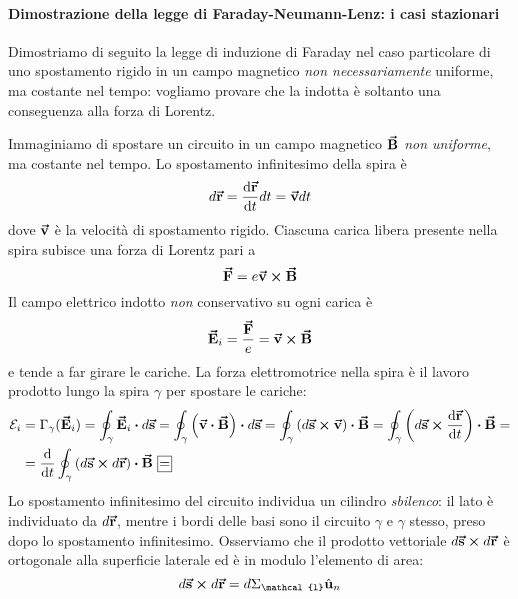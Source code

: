 \paragraph{Dimostrazione della legge di Faraday-Neumann-Lenz: i casi stazionari}
Dimostriamo di seguito la legge di induzione di Faraday nel caso particolare di uno spostamento rigido in un campo magnetico \textit{non necessariamente} uniforme, ma costante nel tempo: vogliamo provare che la \fem indotta è soltanto una conseguenza alla forza di Lorentz.
\begin{demonstration}
	Immaginiamo di spostare un circuito in un campo magnetico $\vb*{\va{B}}$ \textit{non uniforme}, ma costante nel tempo. Lo spostamento infinitesimo della spira è
	\begin{equation*}
		d\vb*{\va{r}}=\dv{\vb*{\va{r}}}{t}dt=\vb*{\va{v}}dt
	\end{equation*}
	dove $\vb*{\va{v}}$ è la velocità di spostamento rigido.	Ciascuna carica libera presente nella spira subisce una forza di Lorentz pari a
	\begin{equation*}
		\vb*{\va{F}}=e\vb*{\va{v}}\cross\vb*{\va{B}}
	\end{equation*}
	Il campo elettrico indotto \textit{non} conservativo su ogni carica è
	\begin{equation*}
		\vb*{\va{E}}_i=\frac{\vb*{\va{F}}}{e}=\vb*{\va{v}}\cross\vb*{\va{B}}
	\end{equation*}
	e tende a far girare le cariche. La forza elettromotrice nella spira è il lavoro prodotto lungo la spira $\gamma$ per spostare le cariche:
	\begin{align*}
		\mathcal{E}_i&=\Gamma_{\gamma}(\vba{E}_i)=\oint_{\gamma} \vba{E}_i\vdot d\vba{s}=\oint_{\gamma} \left(\vba{v}\vdot \vba{B}\right)\vdot d\vba{s}=\oint_{\gamma} \left(d\vba{s}\cross\vba{v}\right)\vdot \vba{B} = \oint_{\gamma} \left(d\vba{s}\cross\dv{\vba{r}}{t}\right)\vdot \vba{B}=\\
		&=\dv{t} \oint_{\gamma}\left(d\vba{s}\cross d\vba{r}\right)\vdot \vba{B}\squarequal
	\end{align*}
	Lo spostamento infinitesimo del circuito individua un cilindro \textit{sbilenco}: il lato è individuato da $d\vb*{\va{r}}$, mentre i bordi delle basi sono il circuito $\gamma$ e $\gamma$ stesso, preso dopo lo spostamento infinitesimo. Osserviamo che il prodotto vettoriale $d\vb*{\va{s}}\cross d\vb*{\va{r}}$ è ortogonale alla superficie laterale ed è in modulo l'elemento di area:
	\begin{equation*}
		d\vba s\cross d\vba r=d\Sigma_{\mathcal{l}}\vbh u_n
	\end{equation*}

\end{demonstration}
